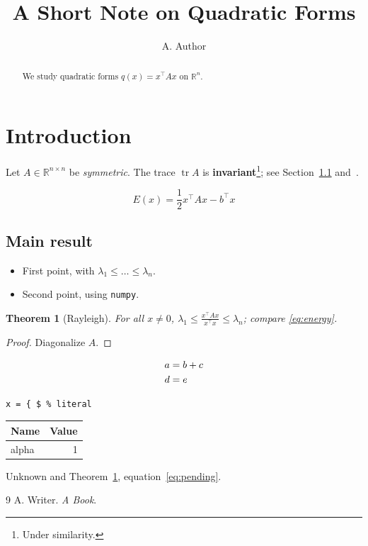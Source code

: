 \documentclass{article}
\title{A Short Note on Quadratic Forms}
\author{A. Author}
\newcommand{\R}{\mathbb{R}}
\DeclareMathOperator{\tr}{tr}
\newtheorem{theorem}{Theorem}[section]
\begin{document}
\maketitle

\begin{abstract}
We study quadratic forms $q(x) = x^\top A x$ on $\R^n$.
\end{abstract}

\section{Introduction}\label{sec:intro}
Let $A \in \R^{n \times n}$ be \emph{symmetric}. %
The trace $\tr A$ is \textbf{invariant}\footnote{Under similarity.}; see
Section~\ref{sec:main} and~\cite{book}.

\begin{equation}\label{eq:energy}
  E(x) = \frac{1}{2} x^\top A x - b^\top x
\end{equation}

\subsection{Main result}\label{sec:main}
\begin{itemize}
  \item First point, with $\lambda_1 \le \dots \le \lambda_n$.
  \item Second point, using \texttt{numpy}.
\end{itemize}

\begin{theorem}[Rayleigh]\label{thm:rayleigh}
For all $x \ne 0$, $\lambda_1 \le \frac{x^\top A x}{x^\top x} \le \lambda_n$; compare \eqref{eq:energy}.
\end{theorem}

\begin{proof}
Diagonalize $A$.
\end{proof}

\begin{align}
  a &= b + c \notag \label{eq:pending} \\
  d &= e
\end{align}

\begin{verbatim}
x = { $ % literal
\end{verbatim}

\begin{tabular}{lr}
Name & Value \\ \hline
alpha & 1 \\
\end{tabular}

Unknown  and Theorem~\ref{thm:rayleigh}, equation~\eqref{eq:pending}.

\begin{thebibliography}{9}
 A. Writer. \emph{A Book}.
\end{thebibliography}
\end{document}
